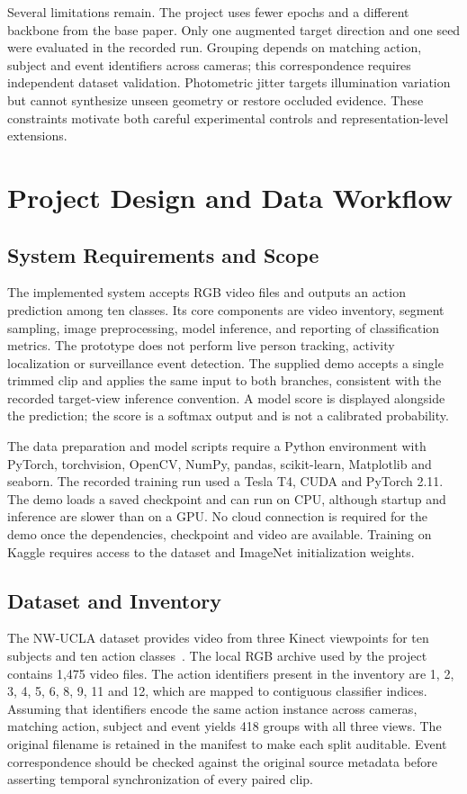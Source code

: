 \documentclass[runningheads]{llncs}
\begin{document}
Several limitations remain. The project uses fewer epochs and a different backbone from the base paper. Only one augmented target direction and one seed were evaluated in the recorded run. Grouping depends on matching action, subject and event identifiers across cameras; this correspondence requires independent dataset validation. Photometric jitter targets illumination variation but cannot synthesize unseen geometry or restore occluded evidence. These constraints motivate both careful experimental controls and representation-level extensions.


\section{Project Design and Data Workflow}
\subsection{System Requirements and Scope}
The implemented system accepts RGB video files and outputs an action prediction among ten classes. Its core components are video inventory, segment sampling, image preprocessing, model inference, and reporting of classification metrics. The prototype does not perform live person tracking, activity localization or surveillance event detection. The supplied demo accepts a single trimmed clip and applies the same input to both branches, consistent with the recorded target-view inference convention. A model score is displayed alongside the prediction; the score is a softmax output and is not a calibrated probability.

The data preparation and model scripts require a Python environment with PyTorch, torchvision, OpenCV, NumPy, pandas, scikit-learn, Matplotlib and seaborn. The recorded training run used a Tesla T4, CUDA and PyTorch 2.11. The demo loads a saved checkpoint and can run on CPU, although startup and inference are slower than on a GPU. No cloud connection is required for the demo once the dependencies, checkpoint and video are available. Training on Kaggle requires access to the dataset and ImageNet initialization weights.

\subsection{Dataset and Inventory}
The NW-UCLA dataset provides video from three Kinect viewpoints for ten subjects and ten action classes~\cite{data}. The local RGB archive used by the project contains 1,475 video files. The action identifiers present in the inventory are 1, 2, 3, 4, 5, 6, 8, 9, 11 and 12, which are mapped to contiguous classifier indices. Assuming that identifiers encode the same action instance across cameras, matching action, subject and event yields 418 groups with all three views. The original filename is retained in the manifest to make each split auditable. Event correspondence should be checked against the original source metadata before asserting temporal synchronization of every paired clip.
\end{document}
